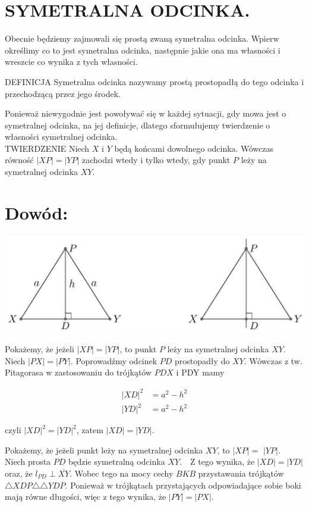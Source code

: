 \documentclass[10pt]{article}
\begin{document}
\section*{SYMETRALNA ODCINKA.}
Obecnie będziemy zajmowali się prostą zwaną symetralna odcinka. Wpierw określimy co to jest symetralna odcinka, następnie jakie ona ma własności i wreszcie co wynika z tych własności.

DEFINICJA Symetralna odcinka nazywamy prostą prostopadłą do tego odcinka i przechodzącą przez jego środek.

Ponieważ niewygodnie jest powoływać się w każdej sytuacji, gdy mowa jest o symetralnej odcinka, na jej definicje, dlatego sformułujemy twierdzenie o własności symetralnej odcinka.\\
TWIERDZENIE Niech \(X\) i \(Y\) będą końcami dowolnego odcinka. Wówczas równość \(|X P|=|Y P|\) zachodzi wtedy i tylko wtedy, gdy punkt \(P\) leży na symetralnej odcinka \(X Y\).

\section*{Dowód:}
\begin{center}
\includegraphics[max width=\textwidth]{2024_11_21_71f62bd117d375398909g-151}
\end{center}

Pokażemy, że jeżeli \(|X P|=|Y P|\), to punkt \(P\) leży na symetralnej odcinka \(X Y\). Niech \(|P X|=|P Y|\). Poprowadźmy odcinek \(P D\) prostopadły do \(X Y\). Wówczas z tw. Pitagorasa w zastosowaniu do trójkątów \(P D X\) i PDY mamy

\[
\begin{aligned}
|X D|^{2} & =a^{2}-h^{2} \\
|Y D|^{2} & =a^{2}-h^{2}
\end{aligned}
\]

czyli \(|X D|^{2}=|Y D|^{2}\), zatem \(|X D|=|Y D|\).

Pokażemy, że jeżeli punkt leży na symetralnej odcinka \(X Y\), to \(|X P|=\) \(|Y P|\).\\
Niech prosta \(P D\) będzie symetralną odcinka \(X Y . \quad \mathrm{Z}\) tego wynika, że \(|X D|=|Y D|\) oraz, że \(l_{P D} \perp \overline{X Y}\). Wobec tego na mocy cechy \(B K B\) przystawania trójkątów\\
\(\triangle X D P \triangle \triangle Y D P\). Ponieważ w trójkątach przystających odpowiadające sobie boki mają równe długości, więc z tego wynika, że \(|P Y|=|P X|\).
\end{document}
